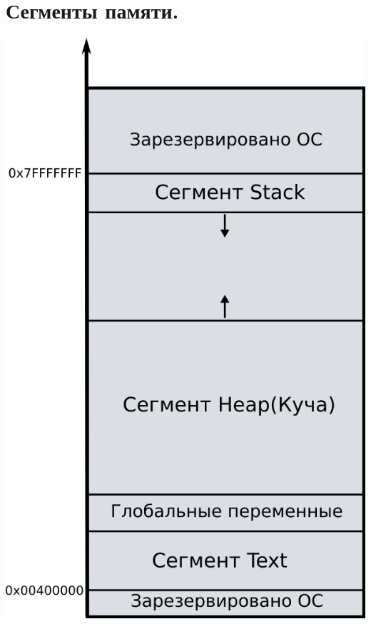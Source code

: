 \documentclass{article}
\begin{document}
\section*{Сегменты памяти.}
\begin{center}
\includegraphics[scale=1.35]{../images/memory_layout.png}
\end{center}
\end{document}
